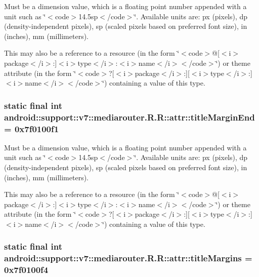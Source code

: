Must be a dimension value, which is a floating point number appended with a unit such as \char`\"{}$<$code$>$14.5sp$<$/code$>$\char`\"{}. Available units are: px (pixels), dp (density-independent pixels), sp (scaled pixels based on preferred font size), in (inches), mm (millimeters). 

This may also be a reference to a resource (in the form \char`\"{}$<$code$>$@\mbox{[}$<$i$>$package$<$/i$>$:\mbox{]}$<$i$>$type$<$/i$>$:$<$i$>$name$<$/i$>$$<$/code$>$\char`\"{}) or theme attribute (in the form \char`\"{}$<$code$>$?\mbox{[}$<$i$>$package$<$/i$>$:\mbox{]}\mbox{[}$<$i$>$type$<$/i$>$:\mbox{]}$<$i$>$name$<$/i$>$$<$/code$>$\char`\"{}) containing a value of this type. \hypertarget{classandroid_1_1support_1_1v7_1_1mediarouter_1_1_r_1_1attr_a391800f934d77b9adaae672c16146d5}{
\subsubsection[{titleMarginEnd}]{\setlength{\rightskip}{0pt plus 5cm}static final int android::support::v7::mediarouter.R.R::attr::titleMarginEnd = 0x7f0100f1}}
\label{classandroid_1_1support_1_1v7_1_1mediarouter_1_1_r_1_1attr_a391800f934d77b9adaae672c16146d5}


Must be a dimension value, which is a floating point number appended with a unit such as \char`\"{}$<$code$>$14.5sp$<$/code$>$\char`\"{}. Available units are: px (pixels), dp (density-independent pixels), sp (scaled pixels based on preferred font size), in (inches), mm (millimeters). 

This may also be a reference to a resource (in the form \char`\"{}$<$code$>$@\mbox{[}$<$i$>$package$<$/i$>$:\mbox{]}$<$i$>$type$<$/i$>$:$<$i$>$name$<$/i$>$$<$/code$>$\char`\"{}) or theme attribute (in the form \char`\"{}$<$code$>$?\mbox{[}$<$i$>$package$<$/i$>$:\mbox{]}\mbox{[}$<$i$>$type$<$/i$>$:\mbox{]}$<$i$>$name$<$/i$>$$<$/code$>$\char`\"{}) containing a value of this type. \hypertarget{classandroid_1_1support_1_1v7_1_1mediarouter_1_1_r_1_1attr_526e2fae3aaf66fbba6471ae26f95a89}{
\subsubsection[{titleMargins}]{\setlength{\rightskip}{0pt plus 5cm}static final int android::support::v7::mediarouter.R.R::attr::titleMargins = 0x7f0100f4}}
\label{classandroid_1_1support_1_1v7_1_1mediarouter_1_1_r_1_1attr_526e2fae3aaf66fbba6471ae26f95a89}


